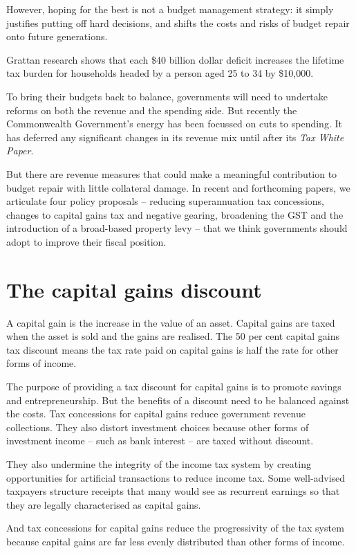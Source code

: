 \documentclass{grattan}\usepackage[]{graphicx}\usepackage[]{color}
\begin{document}
However, hoping for the best is not a budget management strategy: it simply justifies putting off hard decisions, and shifts the costs and risks of budget repair onto future generations.
 
Grattan research shows that each \$40 billion dollar deficit increases the lifetime tax burden for households headed by a person aged 25 to 34 by \$10,000.
 
To bring their budgets back to balance, governments will need to undertake reforms on both the revenue and the spending side. But recently the Commonwealth Government's energy has been focussed on cuts to spending.
It has deferred any significant changes in its revenue mix until after its \emph{Tax White Paper}.
 
But there are revenue measures that could make a meaningful contribution to budget repair with little collateral damage. In recent and forthcoming papers, we articulate four policy proposals -- reducing superannuation tax concessions, changes to capital gains tax and negative gearing, broadening the GST and the introduction of a broad-based property levy -- that we think governments should adopt to improve their fiscal position.

\chapter{The capital gains discount}
A capital gain is the increase in the value of an asset. Capital gains are taxed when the asset is sold and the gains are realised. The 50 per cent capital gains tax discount means the tax rate paid on capital gains is half the rate for other forms of income. 

The purpose of providing a tax discount for capital gains is to promote savings and entrepreneurship. But the benefits of a discount need to be balanced against the costs. Tax concessions for capital gains reduce government revenue collections. They also distort investment choices because other forms of investment income -- such as bank interest -- are taxed without discount. 

They also undermine the integrity of the income tax system by creating opportunities for artificial transactions to reduce income tax. Some well-advised taxpayers structure receipts that many would see as recurrent earnings so that they are legally characterised as capital gains.

And tax concessions for capital gains reduce the progressivity of the tax system because capital gains are far less evenly distributed than other forms of income. 
\end{document}
